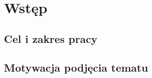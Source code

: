 \chapter{Wstęp}
\label{chap:1}

\section{Cel i zakres pracy}
\label{sec:1:1}

\section{Motywacja podjęcia tematu}
\label{sec:1:2}
